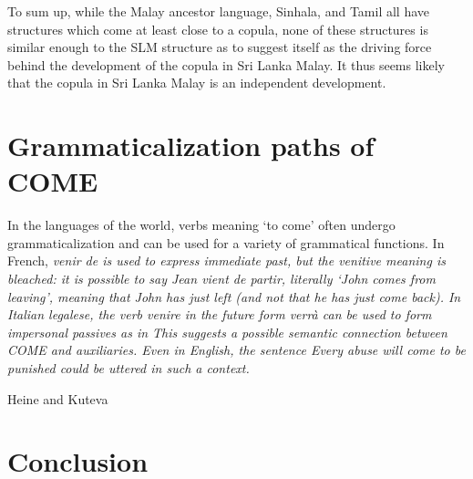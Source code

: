\documentclass[a4paper,12pt]{article}
\begin{document}
To sum up, while the Malay ancestor language, Sinhala, and Tamil all have structures which come at least close to a copula, none of these structures is similar enough to the SLM structure as to suggest itself as the driving force behind the development of the copula in Sri Lanka Malay. It thus seems likely that the copula in Sri Lanka Malay is an independent development.


\section{Grammaticalization paths of COME}
In the languages of the world, verbs meaning `to come' often undergo grammaticalization and can be used for a variety of grammatical functions. In French, \em venir de \em is used to express immediate past, but the venitive meaning is bleached: it is possible to say \em Jean vient de partir\em, literally `John comes from leaving', meaning that John has just left (and not that he has just come back). In Italian legalese, the verb \em venire \em in the future form \em verrà \em can be used to form impersonal passives as in  This suggests a possible semantic connection between COME and auxiliaries. Even in English, the sentence \em Every abuse will come to be punished \em could be uttered in such a context. 

Heine and Kuteva


\section{Conclusion}



\end{document}
